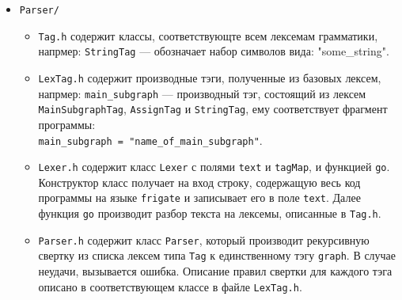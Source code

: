 \documentclass[a4paper, 12pt]{article}
\newcommand{\cd}[1]{\lstinline$#1$}
\begin{document}
	\begin{itemize}
		\item \cd{Parser/}
		\begin{itemize}			
			\item \cd{Tag.h} содержит классы, соответствующте всем лексемам грамматики, напрмер: \cd{StringTag} --- обозначает набор символов вида: "some\_string".
			
			\item \cd{LexTag.h} содержит производные тэги, полученные из базовых лексем, напрмер: \cd{main_subgraph} --- производный тэг, состоящий из лексем \cd{MainSubgraphTag}, \cd{AssignTag} и \cd{StringTag}, ему соответствует фрагмент программы: \\
			\cd{main_subgraph = "name_of_main_subgraph"}.
			
			\item \cd{Lexer.h} содержит класс \cd{Lexer} с полями \cd{text} и \cd{tagMap}, и функцией \cd{go}. Конструктор класс получает на вход строку, содержащую весь код программы на языке \cd{frigate} и записывает его в поле \cd{text}. Далее функция \cd{go} производит разбор текста на лексемы, описанные в \cd{Tag.h}.
			
			\item \cd{Parser.h} содержит класс \cd{Parser}, который производит рекурсивную свертку из списка лексем типа \cd{Tag} к единственному тэгу \cd{graph}. В случае неудачи, вызывается ошибка. Описание правил свертки для каждого тэга описано в соответствующем классе в файле \cd{LexTag.h}.
			

\end{itemize}
\end{itemize}
\end{document}
